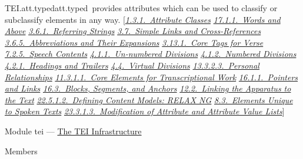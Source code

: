 \begin{reflist}
\item[]\begin{specHead}{TEI.att.typed}{att.typed} provides attributes which can be used to classify or subclassify elements in any way. [\textit{\hyperref[STECAT]{1.3.1.\ Attribute Classes}} \textit{\hyperref[AILCW]{17.1.1.\ Words and Above}} \textit{\hyperref[CONARS]{3.6.1.\ Referring Strings}} \textit{\hyperref[COXR]{3.7.\ Simple Links and Cross-References}} \textit{\hyperref[CONAAB]{3.6.5.\ Abbreviations and Their Expansions}} \textit{\hyperref[COVE]{3.13.1.\ Core Tags for Verse}} \textit{\hyperref[DRPAL]{7.2.5.\ Speech Contents}} \textit{\hyperref[DSDIV1]{4.1.1.\ Un-numbered Divisions}} \textit{\hyperref[DSDIV2]{4.1.2.\ Numbered Divisions}} \textit{\hyperref[DSHD]{4.2.1.\ Headings and Trailers}} \textit{\hyperref[DSVIRT]{4.4.\ Virtual Divisions}} \textit{\hyperref[NDPERSREL]{13.3.2.3.\ Personal Relationships}} \textit{\hyperref[PHCO]{11.3.1.1.\ Core Elements for Transcriptional Work}} \textit{\hyperref[SAPTL]{16.1.1.\ Pointers and Links}} \textit{\hyperref[SASE]{16.3.\ Blocks, Segments, and Anchors}} \textit{\hyperref[TCAPLK]{12.2.\ Linking the Apparatus to the Text}} \textit{\hyperref[TDTAGCONT]{22.5.1.2.\ Defining Content Models: RELAX NG}} \textit{\hyperref[TSBA]{8.3.\ Elements Unique to Spoken Texts}} \textit{\hyperref[MDMDAL]{23.3.1.3.\ Modification of Attribute and Attribute Value Lists}}]\end{specHead} 
    \item[{Module}]
  tei — \hyperref[ST]{The TEI Infrastructure}
    \item[{Members}]

\end{reflist}
